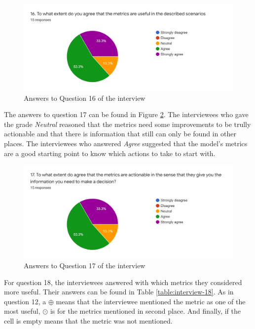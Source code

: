 \begin{figure}[ht!]
\begin{center}
\includegraphics[width=\textwidth]{figures/interview/Question16.png}
\caption{Answers to Question 16 of the interview}
\label{fig:interview-16}
\end{center}
\end{figure}

The answers to question 17 can be found in Figure \ref{fig:interview-17}. The interviewees who gave the grade \textit{Neutral} reasoned that the metrics need some improvements to be trully actionable and that there is information that still can only be found in other places. The interviewees who answered \textit{Agree} suggested that the model's metrics are a good starting point to know which actions to take to start with.

\begin{figure}[ht!]
\begin{center}
\includegraphics[width=\textwidth]{figures/interview/Question17.png}
\caption{Answers to Question 17 of the interview}
\label{fig:interview-17}
\end{center}
\end{figure}

For question 18, the interviewees answered with which metrics they considered more useful. Their answers can be found in Table \ref{table:interview-18}. As in question 12, a $\oplus$ means that the interviewee mentioned the metric as one of the most useful, $\odot$ is for the metrics mentioned in second place. And finally, if the cell is empty means that the metric was not mentioned.

